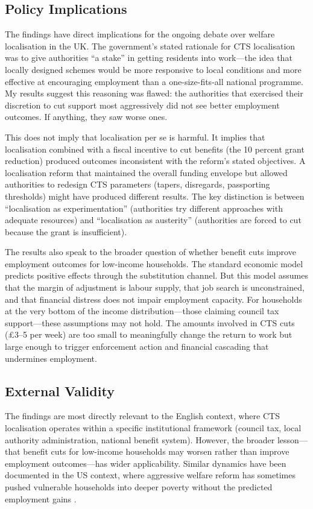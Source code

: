 \documentclass[12pt]{article}
\begin{document}
\subsection{Policy Implications}

The findings have direct implications for the ongoing debate over welfare localisation in the UK. The government's stated rationale for CTS localisation was to give authorities ``a stake'' in getting residents into work---the idea that locally designed schemes would be more responsive to local conditions and more effective at encouraging employment than a one-size-fits-all national programme. My results suggest this reasoning was flawed: the authorities that exercised their discretion to cut support most aggressively did not see better employment outcomes. If anything, they saw worse ones.

This does not imply that localisation per se is harmful. It implies that localisation combined with a fiscal incentive to cut benefits (the 10 percent grant reduction) produced outcomes inconsistent with the reform's stated objectives. A localisation reform that maintained the overall funding envelope but allowed authorities to redesign CTS parameters (tapers, disregards, passporting thresholds) might have produced different results. The key distinction is between ``localisation as experimentation'' (authorities try different approaches with adequate resources) and ``localisation as austerity'' (authorities are forced to cut because the grant is insufficient).

The results also speak to the broader question of whether benefit cuts improve employment outcomes for low-income households. The standard economic model predicts positive effects through the substitution channel. But this model assumes that the margin of adjustment is labour supply, that job search is unconstrained, and that financial distress does not impair employment capacity. For households at the very bottom of the income distribution---those claiming council tax support---these assumptions may not hold. The amounts involved in CTS cuts (\pounds 3--5 per week) are too small to meaningfully change the return to work but large enough to trigger enforcement action and financial cascading that undermines employment.

\subsection{External Validity}

The findings are most directly relevant to the English context, where CTS localisation operates within a specific institutional framework (council tax, local authority administration, national benefit system). However, the broader lesson---that benefit cuts for low-income households may worsen rather than improve employment outcomes---has wider applicability. Similar dynamics have been documented in the US context, where aggressive welfare reform has sometimes pushed vulnerable households into deeper poverty without the predicted employment gains \citep{blank2002evaluating}.
\end{document}
